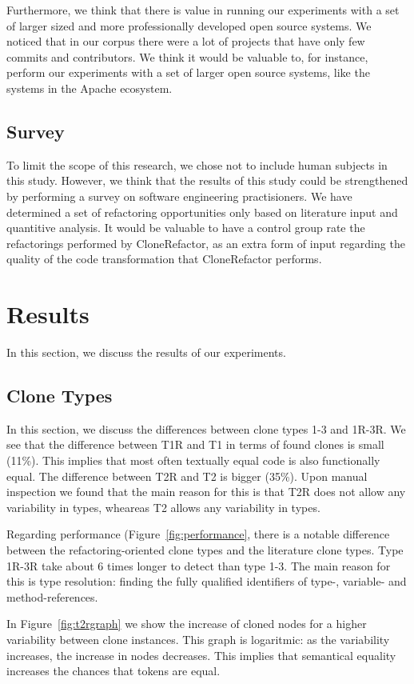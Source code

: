 Furthermore, we think that there is value in running our experiments with a set of larger sized and more professionally developed open source systems. We noticed that in our corpus there were a lot of projects that have only few commits and contributors. We think it would be valuable to, for instance, perform our experiments with a set of larger open source systems, like the systems in the Apache ecosystem.

\subsection{Survey}
To limit the scope of this research, we chose not to include human subjects in this study. However, we think that the results of this study could be strengthened by performing a survey on software engineering practisioners. We have determined a set of refactoring opportunities only based on literature input and quantitive analysis. It would be valuable to have a control group rate the refactorings performed by CloneRefactor, as an extra form of input regarding the quality of the code transformation that CloneRefactor performs.

\section{Results}
In this section, we discuss the results of our experiments.

\subsection{Clone Types}
In this section, we discuss the differences between clone types 1-3 and 1R-3R. We see that the difference between T1R and T1 in terms of found clones is small (11\%). This implies that most often textually equal code is also functionally equal. The difference between T2R and T2 is bigger (35\%). Upon manual inspection we found that the main reason for this is that T2R does not allow any variability in types, wheareas T2 allows any variability in types.

Regarding performance (Figure~\ref{fig:performance}, there is a notable difference between the refactoring-oriented clone types and the literature clone types. Type 1R-3R take about 6 times longer to detect than type 1-3. The main reason for this is type resolution: finding the fully qualified identifiers of type-, variable- and method-references.

In Figure~\ref{fig:t2rgraph} we show the increase of cloned nodes for a higher variability between clone instances. This graph is logaritmic: as the variability increases, the increase in nodes decreases. This implies that semantical equality increases the chances that tokens are equal.

